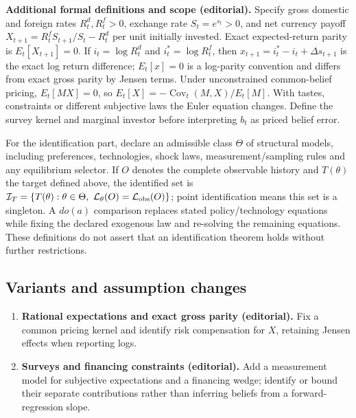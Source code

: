 \documentclass[11pt,a4paper]{article}
\begin{document}
\textbf{Additional formal definitions and scope (editorial).} Specify gross domestic and foreign rates \(R_t^d,R_t^f>0\), exchange rate \(S_t=e^{s_t}>0\), and net currency payoff \(X_{t+1}=R_t^f S_{t+1}/S_t-R_t^d\) per unit initially invested. Exact expected-return parity is \(E_t[X_{t+1}]=0\). If \(i_t=\log R_t^d\) and \(i_t^*=\log R_t^f\), then \(x_{t+1}=i_t^*-i_t+\Delta s_{t+1}\) is the exact log return difference; \(E_t[x]=0\) is a log-parity convention and differs from exact gross parity by Jensen terms. Under unconstrained common-belief pricing, \(E_t[M X]=0\), so \(E_t[X]=-\operatorname{Cov}_t(M,X)/E_t[M]\). With tastes, constraints or different subjective laws the Euler equation changes. Define the survey kernel and marginal investor before interpreting \(b_t\) as priced belief error.

For the identification part, declare an admissible class \(\Theta\) of structural models, including preferences, technologies, shock laws, measurement/sampling rules and any equilibrium selector. If \(O\) denotes the complete observable history and \(T(\theta)\) the target defined above, the identified set is \(\mathcal I_T=\{T(\theta):\theta\in\Theta,\ \mathcal L_\theta(O)=\mathcal L_{\rm obs}(O)\}\); point identification means this set is a singleton. A \(do(a)\) comparison replaces stated policy/technology equations while fixing the declared exogenous law and re-solving the remaining equations. These definitions do not assert that an identification theorem holds without further restrictions.
\subsection*{Variants and assumption changes}
\begin{enumerate}
\item \textbf{Rational expectations and exact gross parity (editorial).} Fix a common pricing kernel and identify risk compensation for \(X\), retaining Jensen effects when reporting logs.
\item \textbf{Surveys and financing constraints (editorial).} Add a measurement model for subjective expectations and a financing wedge; identify or bound their separate contributions rather than inferring beliefs from a forward-regression slope.
\end{enumerate}
\end{document}

